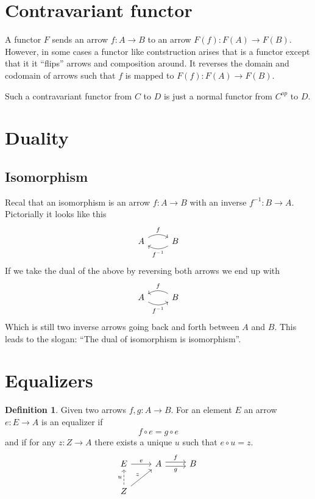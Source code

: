 \documentclass{book}
\theoremstyle{definition}
\newtheorem{definition}{Definition}[section]
\begin{document}
\section{Contravariant functor}

A functor $F$ sends an arrow $f : A \to B$ to an arrow $F(f) : F(A) \to F(B)$.
However, in some cases a functor like contstruction arises that is a functor
except that it it ``flips'' arrows and composition around. It reverses the
domain and codomain of arrows such that $f$ is mapped to $F(f) : F(A) \to F(B)$.

Such a contravariant functor from $C$ to $D$ is just a normal functor from
$C^{op}$ to $D$.

\section{Duality}

\subsection{Isomorphism}

Recal that an isomorphism is an arrow $f : A \to B$ with an inverse
$f^{-1} : B \to A$. Pictorially it looks like this
\[
  \begin{tikzcd}
    A \ar[r, bend left, "f"] & B \ar[l, bend left, "f^{-1}"]
  \end{tikzcd}
\]
If we take the dual of the above by reversing both arrows we end up with
\[
  \begin{tikzcd}
    A \ar[r, bend right, "f^{-1}"'] & B \ar[l, bend right, "f"']
  \end{tikzcd}
\]
Which is still two inverse arrows going back and forth between $A$ and $B$. This
leads to the slogan: ``The dual of isomorphism is isomorphism''.

\section{Equalizers}

\begin{definition}
  Given two arrows $f, g : A \to B$. For an element $E$ an arrow $e : E \to A$ is an
  equalizer if
  \[
    f \circ e = g \circ e
  \]
  and if for any $z : Z \to A$ there exists a unique $u$ such that $e \circ u = z$.
  \[
    \begin{tikzcd}
      E \ar[r, "e"] & A \ar[r, shift left, "f"] \ar[r, shift right, "g"'] & B \\
      Z \ar[u, dashrightarrow, "u"] \ar[ur, "z"]
    \end{tikzcd}
  \]
\end{definition}
\end{document}
